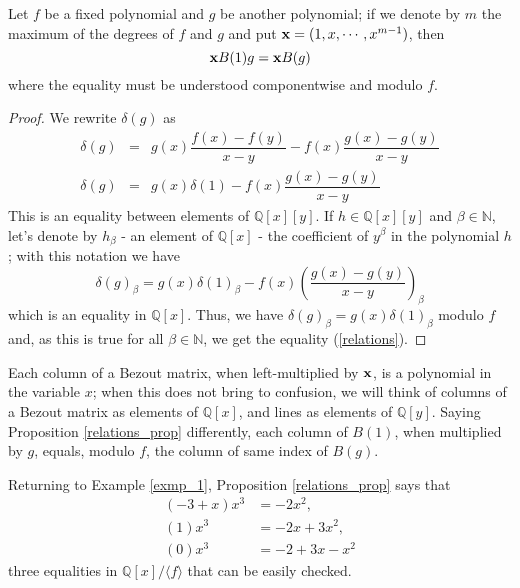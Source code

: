 \documentclass{standalone}
\begin{document}
\begin{prop}
\label{relations_prop}
Let $f$ be a fixed polynomial and $g$ be another polynomial; if we denote by $m$ the maximum of the degrees of $f$ and $g$ and put $\bold{x} = (1, x,\cdots, x^{m-1})$, then
\begin{equation}
\label{relations}
	\bold{x}B(1)g = \bold{x}B(g)
\end{equation}
where the equality must be understood componentwise and modulo $f$.
\end{prop}
\begin{proof}
We rewrite $\delta(g)$ as
\begin{align*}
	\delta(g) & = & g(x)\dfrac{f(x)-f(y)}{x-y} - f(x)\dfrac{g(x)-g(y)}{x-y} \\ \nonumber
	\delta(g) & = & g(x)\delta(1) - f(x)\dfrac{g(x)-g(y)}{x-y}
\end{align*}
This is an equality between elements of $\mathbb{Q}[x][y]$. 
If $h\in \mathbb{Q}[x][y]$ and $\beta\in\mathbb{N}$, let's denote by $h_\beta$ - an element of $\mathbb{Q}[x]$ - the coefficient of $y^\beta$ in the polynomial $h$; 
with this notation we have
$$\delta(g)_\beta = g(x)\delta(1)_\beta - f(x)\left(\dfrac{g(x)-g(y)}{x-y}\right)_\beta$$
which is an equality in $\mathbb{Q}[x]$. Thus, we have $\delta(g)_\beta = g(x)\delta(1)_\beta$ modulo $f$ and, as this is true for all $\beta\in\mathbb{N}$, we get the equality (\ref{relations}).
\end{proof}

\begin{rem}
Each column of a Bezout matrix, when left-multiplied by $\bold{x}$, is a polynomial in the variable $x$; when this does not bring to confusion, we will think of columns of a Bezout matrix as elements of $\mathbb{Q}[x]$, and lines as elements of $\mathbb{Q}[y]$.
Saying Proposition \ref{relations_prop} differently, each column of $B(1)$, when multiplied by $g$, equals, modulo $f$, the column of same index of $B(g)$.
\end{rem}

\begin{exmp}
Returning to Example \ref{exmp_1}, Proposition \ref{relations_prop} says that
\begin{align*}
 (-3 + x)x^3 &= -2x^2, \\
 (1)x^3 &= -2x + 3x^2, \\
 (0)x^3 &= -2 + 3x - x^2
\end{align*}
three equalities in $\mathbb{Q}[x]/\langle f \rangle$ that can be easily checked.
\end{exmp}
\end{document}
